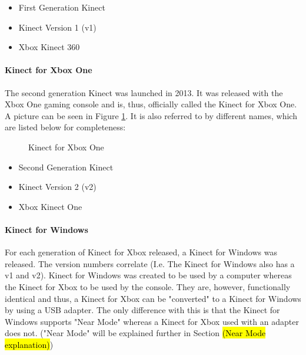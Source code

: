 \begin{itemize}
	\item First Generation Kinect 
	\item Kinect Version 1 (v1)
	\item Xbox Kinect 360 
\end{itemize} 

\paragraph{Kinect for Xbox One}
The second generation Kinect was launched in 2013. It was released with the Xbox One gaming console and is, thus, officially called the Kinect for Xbox One. \cite{kinectComp2011} A picture can be seen in Figure \ref{fig:kinectOne}. It is also referred to by different names, which are listed below for completeness:

\begin{figure}[ht]
	\centering
	{%
		\setlength{\fboxsep}{0pt}%
		\setlength{\fboxrule}{0.5pt}%
		}
	\caption{Kinect for Xbox One \cite{kinectComp2011}}
	\label{fig:kinectOne}
\end{figure}

\begin{itemize}
	\item Second Generation Kinect 
	\item Kinect Version 2 (v2)
	\item Xbox Kinect One 
\end{itemize} 

\paragraph{Kinect for Windows}
For each generation of Kinect for Xbox released, a Kinect for Windows was released. The version numbers correlate (I.e. The Kinect for Windows also has a v1 and v2). Kinect for Windows was created to be used by a computer whereas the Kinect for Xbox to be used by the console. They are, however, functionally identical and thus, a Kinect for Xbox can be "converted" to a  Kinect for Windows by using a USB adapter. The only difference with this is that the Kinect for Windows supports "Near Mode" whereas a Kinect for Xbox used with an adapter does not. ("Near Mode" will be explained further in Section \hl{(Near Mode explanation)})

